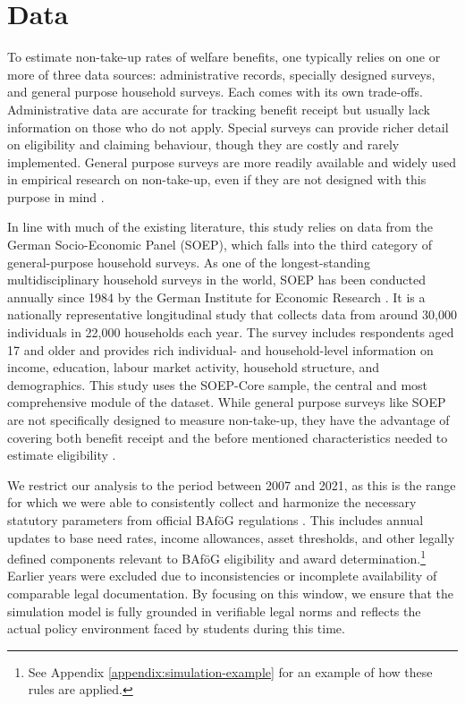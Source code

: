 %
%




\section{Data}
To estimate non-take-up rates of welfare benefits, one typically relies on one or more of three data sources: administrative records, specially designed surveys, and general purpose household surveys.
Each comes with its own trade-offs. 
Administrative data are accurate for tracking benefit receipt but usually lack information on those who do not apply. 
Special surveys can provide richer detail on eligibility and claiming behaviour, though they are costly and rarely implemented. 
General purpose surveys are more readily available and widely used in empirical research on non-take-up, even if they are not designed with this purpose in mind \citep{mechelen_who_2017}.

In line with much of the existing literature, this study relies on data from the German Socio-Economic Panel (SOEP), which falls into the third category of general-purpose household surveys. 
As one of the longest-standing multidisciplinary household surveys in the world, SOEP has been conducted annually since 1984 by the German Institute for Economic Research \citep{soepcore_v39}. 
It is a nationally representative longitudinal study that collects data from around 30,000 individuals in 22,000 households each year. 
The survey includes respondents aged 17 and older and provides rich individual- and household-level information on income, education, labour market activity, household structure, and demographics. 
This study uses the SOEP-Core sample, the central and most comprehensive module of the dataset. While general purpose surveys like SOEP are not specifically designed to measure non-take-up, they have the advantage of covering both benefit receipt and the before mentioned characteristics needed to estimate eligibility \citep{mechelen_who_2017}.

We restrict our analysis to the period between 2007 and 2021, as this is the range for which we were able to consistently collect and harmonize the necessary statutory parameters from official BAföG regulations \citep{bafoeg_law}. This includes annual updates to base need rates, income allowances, asset thresholds, and other legally defined components relevant to BAföG eligibility and award determination.\footnote{
  See Appendix \ref{appendix:simulation-example} for an example of how these rules are applied.
}
Earlier years were excluded due to inconsistencies or incomplete availability of comparable legal documentation. 
By focusing on this window, we ensure that the simulation model is fully grounded in verifiable legal norms and reflects the actual policy environment faced by students during this time.

